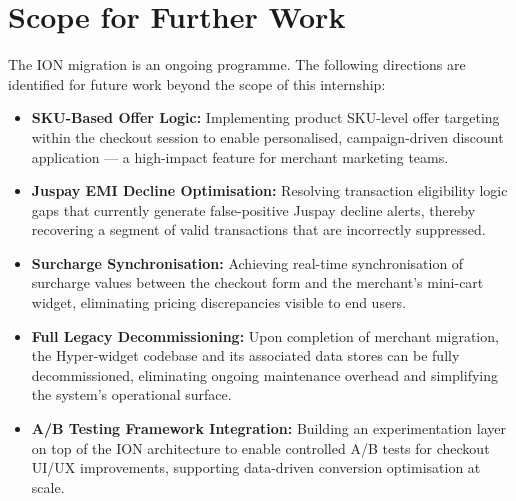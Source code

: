 \section*{Scope for Further Work}

The ION migration is an ongoing programme. The following directions are identified for future work beyond the scope of this internship:

\begin{itemize}
  \item \textbf{SKU-Based Offer Logic:} Implementing product SKU-level offer targeting within the checkout session to enable personalised, campaign-driven discount application --- a high-impact feature for merchant marketing teams.

  \item \textbf{Juspay EMI Decline Optimisation:} Resolving transaction eligibility logic gaps that currently generate false-positive Juspay decline alerts, thereby recovering a segment of valid transactions that are incorrectly suppressed.

  \item \textbf{Surcharge Synchronisation:} Achieving real-time synchronisation of surcharge values between the checkout form and the merchant's mini-cart widget, eliminating pricing discrepancies visible to end users.

  \item \textbf{Full Legacy Decommissioning:} Upon completion of merchant migration, the Hyper-widget codebase and its associated data stores can be fully decommissioned, eliminating ongoing maintenance overhead and simplifying the system's operational surface.

  \item \textbf{A/B Testing Framework Integration:} Building an experimentation layer on top of the ION architecture to enable controlled A/B tests for checkout UI/UX improvements, supporting data-driven conversion optimisation at scale.
\end{itemize}

